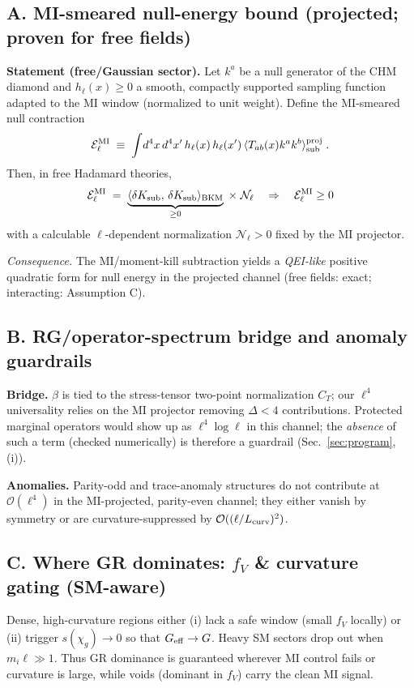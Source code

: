 \documentclass[aps,prd,onecolumn,superscriptaddress,nofootinbib]{revtex4-2}
\begin{document}
\subsection*{A. MI-smeared null-energy bound (projected; proven for free fields)}
\noindent\textbf{Statement (free/Gaussian sector).} Let \(k^a\) be a null generator of the CHM diamond and \(h_\ell(x)\ge0\) a smooth, compactly supported sampling function adapted to the MI window (normalized to unit weight). Define the MI-smeared null contraction
\[
\mathcal{E}^{\rm MI}_\ell \;\equiv\; \int\! d^4x\,d^4x'\,h_\ell(x)\,h_\ell(x')\, \langle T_{ab}(x)k^a k^b \rangle_{\rm sub}^{\rm proj}\;.
\]
Then, in free Hadamard theories,
\[
\mathcal{E}^{\rm MI}_\ell \;=\; \underbrace{\langle \delta K_{\rm sub},\,\delta K_{\rm sub}\rangle_{\rm BKM}}_{\ge 0}\;\times\; \mathcal{N}_\ell
\quad\Rightarrow\quad
\mathcal{E}^{\rm MI}_\ell \ge 0
\]
with a calculable \(\ell\)-dependent normalization \(\mathcal N_\ell>0\) fixed by the MI projector.

\smallskip
\noindent\emph{Consequence.} The MI/moment-kill subtraction yields a \emph{QEI-like} positive quadratic form for null energy in the projected channel (free fields: exact; interacting: Assumption C).

\subsection*{B. RG/operator-spectrum bridge and anomaly guardrails}
\noindent\textbf{Bridge.} \(\beta\) is tied to the stress-tensor two-point normalization \(C_T\); our \(\ell^4\) universality relies on the MI projector removing \(\Delta<4\) contributions. Protected marginal operators would show up as \(\ell^4\log\ell\) in this channel; the \emph{absence} of such a term (checked numerically) is therefore a guardrail (Sec.~\ref{sec:program}, (i)).

\noindent\textbf{Anomalies.} Parity-odd and trace-anomaly structures do not contribute at \(\mathcal O(\ell^4)\) in the MI-projected, parity-even channel; they either vanish by symmetry or are curvature-suppressed by \(\mathcal O((\ell/L_{\rm curv})^2)\).

\subsection*{C. Where GR dominates: $f_V$ \& curvature gating (SM-aware)}
\noindent Dense, high-curvature regions either (i) lack a safe window (small \(f_V\) locally) or (ii) trigger \(s(\chi_g)\to 0\) so that \(G_{\rm eff}\to G\). Heavy SM sectors drop out when \(m_i\ell\gg 1\). Thus GR dominance is guaranteed wherever MI control fails or curvature is large, while voids (dominant in \(f_V\)) carry the clean MI signal.
\end{document}
